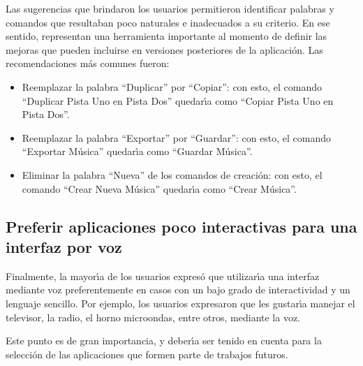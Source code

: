 Las sugerencias que brindaron los usuarios permitieron identificar palabras y comandos que 
resultaban poco naturales e inadecuados a su criterio. En ese sentido, representan una herramienta
importante al momento de definir las mejoras que pueden incluirse en versiones posteriores de la
aplicaci\'on. Las recomendaciones m\'as comunes fueron:

\begin{itemize}
    \item Reemplazar la palabra ``Duplicar'' por ``Copiar'': con esto, el comando 
    ``Duplicar Pista Uno en Pista Dos'' quedar{{\'\i}}a como ``Copiar Pista Uno en Pista Dos''. 
    \item Reemplazar la palabra ``Exportar'' por ``Guardar'': con esto, el comando 
    ``Exportar M\'usica'' quedar{{\'\i}}a como ``Guardar M\'usica''.
    \item Eliminar la palabra ``Nueva'' de los comandos de creaci\'on: con esto, el comando 
    ``Crear Nueva M\'usica'' quedar{{\'\i}}a como ``Crear M\'usica''.
\end{itemize}

\subsection{Preferir aplicaciones poco interactivas para una interfaz por voz}
Finalmente, la mayor{{\'\i}}a de los usuarios expres\'o que utilizar{{\'\i}}a una interfaz mediante voz
preferentemente en casos con un bajo grado de interactividad y un lenguaje sencillo.
Por ejemplo, los usuarios expresaron que les gustar{{\'\i}}a manejar el televisor, la radio, 
el horno microondas, entre otros, mediante la voz.

Este punto es de gran importancia, y deber{\'\i}a ser tenido en cuenta para la selecci\'on de las aplicaciones
que formen parte de trabajos futuros.
